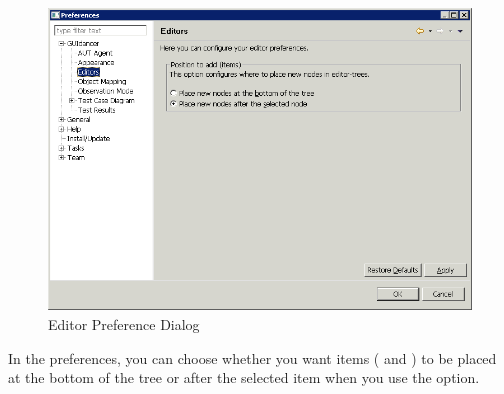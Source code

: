 \label{editorprefs}


\begin{figure}[h]
\begin{center}
\includegraphics[width=12.5cm]{Tasks/Preferences/PS/editorprefs1}
\caption{Editor Preference Dialog}
\label{editorprefs}
\end{center}
\end{figure}


In the  preferences, you can choose whether you want items (\gdcases{} and \gdsteps{}) to be placed at the bottom of the tree or after the selected item when you use the  option. 


